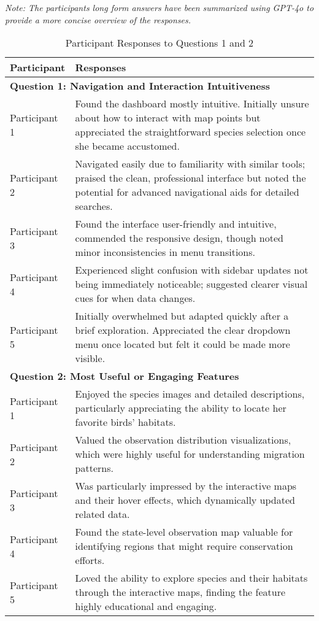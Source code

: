 \textit{Note: The participants long form answers have been summarized using GPT-4o to provide a more concise overview of the responses.}

\begin{table}[H]
    \centering
    \begin{tabular}{p{3cm} | p{12cm}}
        \hline
        \textbf{Participant} & \textbf{Responses} \\
        \hline
        \multicolumn{2}{l}{\textbf{Question 1: Navigation and Interaction Intuitiveness}} \\
        \hline
        Participant 1 & Found the dashboard mostly intuitive. Initially unsure about how to interact with map points but appreciated the straightforward species selection once she became accustomed. \\
        \hline
        Participant 2 & Navigated easily due to familiarity with similar tools; praised the clean, professional interface but noted the potential for advanced navigational aids for detailed searches. \\
        \hline
        Participant 3 & Found the interface user-friendly and intuitive, commended the responsive design, though noted minor inconsistencies in menu transitions. \\
        \hline
        Participant 4 & Experienced slight confusion with sidebar updates not being immediately noticeable; suggested clearer visual cues for when data changes. \\
        \hline
        Participant 5 & Initially overwhelmed but adapted quickly after a brief exploration. Appreciated the clear dropdown menu once located but felt it could be made more visible. \\
        \hline
        \multicolumn{2}{l}{\textbf{Question 2: Most Useful or Engaging Features}} \\
        \hline
        Participant 1 & Enjoyed the species images and detailed descriptions, particularly appreciating the ability to locate her favorite birds' habitats. \\
        \hline
        Participant 2 & Valued the observation distribution visualizations, which were highly useful for understanding migration patterns. \\
        \hline
        Participant 3 & Was particularly impressed by the interactive maps and their hover effects, which dynamically updated related data. \\
        \hline
        Participant 4 & Found the state-level observation map valuable for identifying regions that might require conservation efforts. \\
        \hline
        Participant 5 & Loved the ability to explore species and their habitats through the interactive maps, finding the feature highly educational and engaging. \\
        \hline
    \end{tabular}
    \caption{Participant Responses to Questions 1 and 2}
    \label{tab:responses1}
\end{table}


